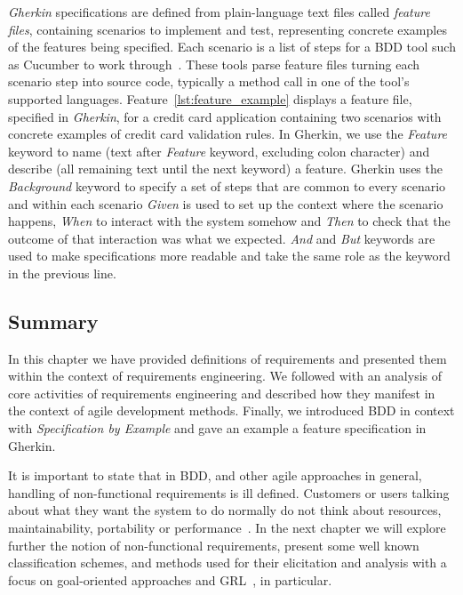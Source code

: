 \documentclass[dissertation,final]{softeng}
\begin{document}
\emph{Gherkin} specifications are  defined from plain-language text files called \emph{feature files}, containing scenarios to implement and test, representing concrete examples of the features being specified. Each scenario is a list of steps for a BDD tool such as Cucumber to work through~\citep{wynne2012cucumber}. These tools parse feature files turning each scenario step into source code, typically a method call in one of the tool's supported languages. 
Feature~\ref{lst:feature_example} displays a feature file, specified in \emph{Gherkin}, for a credit card application containing two scenarios with concrete examples of credit card validation rules. In Gherkin, we use the \emph{Feature} keyword to name (text after \emph{Feature} keyword, excluding colon character) and describe (all remaining text until the next keyword) a feature. Gherkin uses the \emph{Background} keyword to specify a set of steps that are common to every scenario and within each scenario \emph{Given} is used to set up the context where the scenario happens, \emph{When} to interact with the system somehow and \emph{Then} to check that the outcome of that interaction was what we expected. \emph{And} and \emph{But} keywords are used to make specifications more readable and take the same role as the keyword in the previous line.

\subsection{Summary}

In this chapter we have provided definitions of requirements and presented them within the context of requirements engineering. We followed with an analysis of core activities of requirements engineering and described how they manifest in the context of agile development methods. Finally, we introduced BDD in context with \emph{Specification by Example} and gave an example a feature specification in Gherkin.

It is important to state that in BDD, and other agile approaches in general, handling of non-functional requirements is ill defined. Customers or users talking about what they want the system to do normally do not think about resources, maintainability, portability or performance~\citep{Paetsch:2003tl}. In the next chapter we will explore further the notion of non-functional requirements, present some well known classification schemes, and methods used for their elicitation and analysis with a focus on goal-oriented approaches and GRL~\citep{Amyot2010}, in particular.
\end{document}
